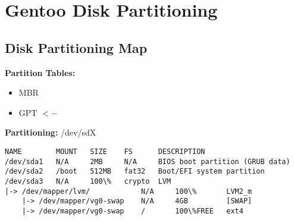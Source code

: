 \documentclass[10pt, a4paper, onecolumn, openany]{book}         %
\begin{document}
\chapter{Gentoo Disk Partitioning}%
\section{Disk Partitioning Map}
\textbf{Partition Tables:}
\begin{itemize}
    \item MBR
    \item GPT $<-$
\end{itemize}
\textbf{Partitioning:}\newline
/dev/sdX
\begin{Verbatim}
NAME        MOUNT   SIZE    FS      DESCRIPTION  
/dev/sda1   N/A     2MB     N/A     BIOS boot partition (GRUB data)
/dev/sda2   /boot   512MB   fat32   Boot/EFI system partition 
/dev/sda3   N/A     100\%   crypto  LVM
|-> /dev/mapper/lvm/            N/A     100\%       LVM2_m
    |-> /dev/mapper/vg0-swap    N/A     4GB         [SWAP]
    |-> /dev/mapper/vg0-swap    /       100\%FREE   ext4
\end{Verbatim}
\end{document}
